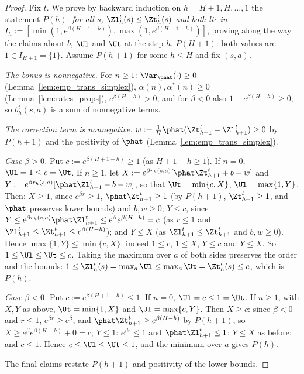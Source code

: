 \begin{proof}
\leanok
Fix $t$. We prove by backward induction on $h = H + 1, H, \dots, 1$ the statement $P(h)$:
\emph{for all $s$, $\Zl^t_h(s) \le \Zt^t_h(s)$ and both lie in $I_h := [\min(1, e^{\beta(H + 1 - h)}), \max(1, e^{\beta(H + 1 - h)})]$},
proving along the way the claims about $b$, $\Ul$ and $\Ut$ at the step $h$. $P(H + 1)$: both
values are $1 \in I_{H+1} = \{1\}$. Assume $P(h + 1)$ for some $h \le H$ and fix $(s, a)$.

\emph{The bonus is nonnegative.} For $n \ge 1$: $\Var_{\phat}(\cdot) \ge 0$ (Lemma~\ref{lem:emp_trans_simplex}),
$\alpha(n), \alpha^*(n) \ge 0$ (Lemma~\ref{lem:rates_props}), $e^{\beta(H - h)} > 0$, and for $\beta < 0$
also $1 - e^{\beta(H - h)} \ge 0$; so $b_h^t(s, a)$ is a sum of nonnegative terms.

\emph{The correction term is nonnegative.} $w := \frac1H \phat(\Zt^t_{h+1} - \Zl^t_{h+1}) \ge 0$ by
$P(h + 1)$ and the positivity of $\phat$ (Lemma~\ref{lem:emp_trans_simplex}).

\emph{Case $\beta > 0$.} Put $c := e^{\beta(H + 1 - h)} \ge 1$ (as $H + 1 - h \ge 1$). If $n = 0$,
$\Ul = 1 \le c = \Ut$. If $n \ge 1$, let $X := e^{\beta r_h(s, a)}[\phat\Zt^t_{h+1} + b + w]$ and
$Y := e^{\beta r_h(s, a)}[\phat\Zl^t_{h+1} - b - w]$, so that $\Ut = \min\{c, X\}$, $\Ul = \max\{1, Y\}$.
Then: $X \ge 1$, since $e^{\beta r} \ge 1$, $\phat \Zt^t_{h+1} \ge 1$ (by $P(h + 1)$, $\Zt^t_{h+1} \ge 1$,
and $\phat$ preserves lower bounds) and $b, w \ge 0$; $Y \le c$, since
$Y \le e^{\beta r_h(s, a)} \phat \Zl^t_{h+1} \le e^{\beta} e^{\beta(H - h)} = c$ (as $r \le 1$ and
$\Zl^t_{h+1} \le \Zt^t_{h+1} \le e^{\beta(H - h)}$); and $Y \le X$ (as $\Zl^t_{h+1} \le \Zt^t_{h+1}$ and
$b, w \ge 0$). Hence $\max\{1, Y\} \le \min\{c, X\}$: indeed $1 \le c$, $1 \le X$, $Y \le c$ and
$Y \le X$. So $1 \le \Ul \le \Ut \le c$. Taking the maximum over $a$ of both sides preserves
the order and the bounds: $1 \le \Zl^t_h(s) = \max_a \Ul \le \max_a \Ut = \Zt^t_h(s) \le c$, which is $P(h)$.

\emph{Case $\beta < 0$.} Put $c := e^{\beta(H + 1 - h)} \le 1$. If $n = 0$, $\Ul = c \le 1 = \Ut$. If
$n \ge 1$, with $X, Y$ as above, $\Ut = \min\{1, X\}$ and $\Ul = \max\{c, Y\}$. Then $X \ge c$: since
$\beta < 0$ and $r \le 1$, $e^{\beta r} \ge e^{\beta}$, and $\phat\Zt^t_{h+1} \ge e^{\beta(H - h)}$ by
$P(h + 1)$, so $X \ge e^{\beta} e^{\beta(H - h)} + 0 = c$; $Y \le 1$: $e^{\beta r} \le 1$ and
$\phat\Zl^t_{h+1} \le 1$; $Y \le X$ as before; and $c \le 1$. Hence $c \le \Ul \le \Ut \le 1$, and the
minimum over $a$ gives $P(h)$.

The final claims restate $P(h + 1)$ and positivity of the lower bounds.
\end{proof}

